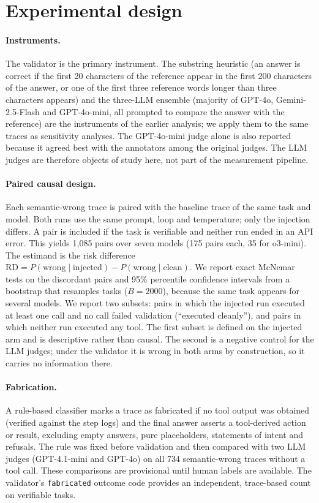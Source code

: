 \documentclass[pdflatex,sn-mathphys-num,Numbered]{sn-jnl}
\begin{document}
\section{Experimental design}\label{sec:design}

\paragraph{Instruments.} The validator is the primary instrument. The substring heuristic (an answer is correct if the first 20 characters of the reference appear in the first 200 characters of the answer, or one of the first three reference words longer than three characters appears) and the three-LLM ensemble (majority of GPT-4o, Gemini-2.5-Flash and GPT-4o-mini, all prompted to compare the answer with the reference) are the instruments of the earlier analysis; we apply them to the same traces as sensitivity analyses. The GPT-4o-mini judge alone is also reported because it agreed best with the annotators among the original judges. The LLM judges are therefore objects of study here, not part of the measurement pipeline.

\paragraph{Paired causal design.} Each semantic-wrong trace is paired with the baseline trace of the same task and model. Both runs use the same prompt, loop and temperature; only the injection differs. A pair is included if the task is verifiable and neither run ended in an API error. This yields 1,085 pairs over seven models (175 pairs each, 35 for o3-mini). The estimand is the risk difference $\mathrm{RD}=P(\text{wrong}\mid\text{injected})-P(\text{wrong}\mid\text{clean})$. We report exact McNemar tests on the discordant pairs \cite{mcnemar1947} and 95\% percentile confidence intervals from a bootstrap that resamples tasks ($B=2000$), because the same task appears for several models. We report two subsets: pairs in which the injected run executed at least one call and no call failed validation (``executed cleanly''), and pairs in which neither run executed any tool. The first subset is defined on the injected arm and is descriptive rather than causal. The second is a negative control for the LLM judges; under the validator it is wrong in both arms by construction, so it carries no information there.

\paragraph{Fabrication.} A rule-based classifier marks a trace as fabricated if no tool output was obtained (verified against the step logs) and the final answer asserts a tool-derived action or result, excluding empty answers, pure placeholders, statements of intent and refusals. The rule was fixed before validation and then compared with two LLM judges (GPT-4.1-mini and GPT-4o) on all 734 semantic-wrong traces without a tool call. These comparisons are provisional until human labels are available. The validator's \texttt{fabricated} outcome code provides an independent, trace-based count on verifiable tasks.
\end{document}
